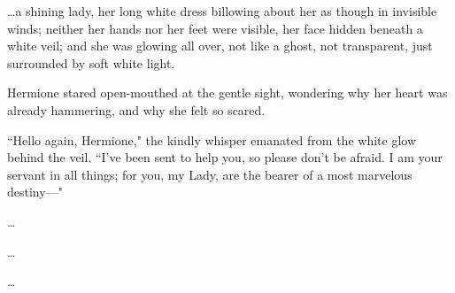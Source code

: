 {\ldots}a shining lady, her long white dress billowing about her as though in invisible winds; neither her hands nor her feet were visible, her face hidden beneath a white veil; and she was glowing all over, not like a ghost, not transparent, just surrounded by soft white light.

Hermione stared open-mouthed at the gentle sight, wondering why her heart was already hammering, and why she felt so scared.

``Hello again, Hermione," the kindly whisper emanated from the white glow behind the veil. ``I've been sent to help you, so please don't be afraid. I am your servant in all things; for you, my Lady, are the bearer of a most marvelous destiny—"

\begin{center}
{\ldots}

{\ldots}

{\ldots}
\end{center}

